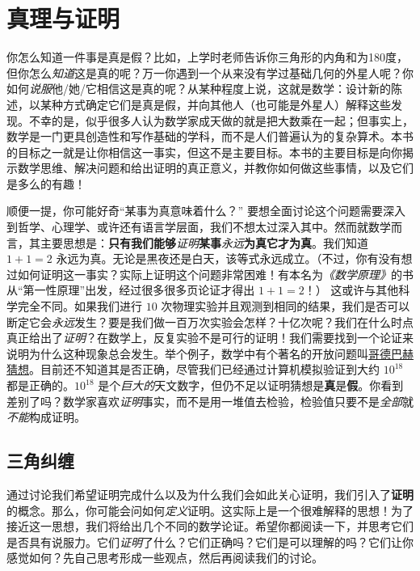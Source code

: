 \section{真理与证明}\label{sec:section1.1}

你怎么知道一件事是真是假？比如，上学时老师告诉你三角形的内角和为180度，但你怎么\textit{知道}这是真的呢？万一你遇到一个从来没有学过基础几何的外星人呢？你如何\textit{说服}他/她/它相信这是真的呢？从某种程度上说，这就是数学：设计新的陈述，以某种方式确定它们是真是假，并向其他人（也可能是外星人）解释这些发现。不幸的是，似乎很多人认为数学家成天做的就是把大数乘在一起；但事实上，数学是一门更具创造性和写作基础的学科，而不是人们普遍认为的复杂算术。本书的目标之一就是让你相信这一事实，但这不是主要目标。本书的主要目标是向你揭示数学思维、解决问题和给出证明的真正意义，并教你如何做这些事情，以及它们是多么的有趣！

顺便一提，你可能好奇“某事为真意味着什么？” 要想全面讨论这个问题需要深入到哲学、心理学、或许还有语言学层面，我们不想太过深入其中。然而就数学而言，其主要思想是：\textbf{只有我们能够}\textit{证明}\textbf{某事}\textit{永远}\textbf{为真它才为真}。我们知道 $1+1=2$ 永远为真。无论是黑夜还是白天，该等式永远成立。（不过，你有没有想过如何证明这一事实？实际上证明这个问题非常困难！有本名为\textit{《数学原理》}的书从“第一性原理”出发，经过很多很多页论证才得出 $1+1=2$！） 这或许与其他科学完全不同。如果我们进行 $10$ 次物理实验并且观测到相同的结果，我们是否可以断定它会\textit{永远}发生？要是我们做一百万次实验会怎样？十亿次呢？我们在什么时点真正给出了\textit{证明}？在数学上，反复实验不是可行的证明！我们需要找到一个论证来说明为什么这种现象总会发生。举个例子，数学中有个著名的开放问题叫\href{https://baike.baidu.com/item/哥德巴赫猜想/72364}{哥德巴赫猜想}。目前还不知道其是否正确，尽管我们已经通过计算机模拟验证到大约 $10^18$ 都是正确的。$10^18$ 是个\textit{巨大的}天文数字，但仍不足以证明猜想是\textbf{真}是\textbf{假}。你看到差别了吗？数学家喜欢\textit{证明}事实，而不是用一堆值去检验，检验值只要不是\textit{全部}就\textit{不能}构成证明。

\subsection{三角纠缠}\label{sec:section1.1.1}

通过讨论我们希望证明完成什么以及为什么我们会如此关心证明，我们引入了\textbf{证明}的概念。那么，你可能会问如何\textit{定义}证明。这实际上是一个很难解释的思想！为了接近这一思想，我们将给出几个不同的数学论证。希望你都阅读一下，并思考它们是否具有说服力。它们\textit{证明}了什么？它们正确吗？它们是可以理解的吗？它们让你感觉如何？先自己思考形成一些观点，然后再阅读我们的讨论。

